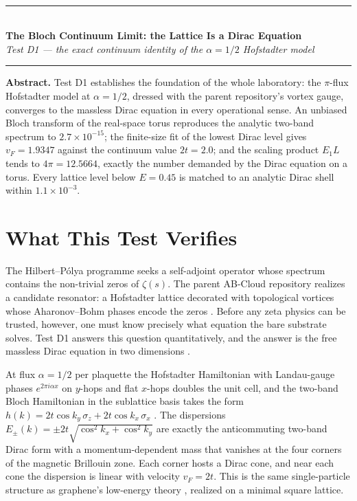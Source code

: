 \documentclass[11pt,a4paper]{article}
\begin{document}
\\[0.3em]
\rule{\textwidth}{0.8pt}\\[0.6em]
{\LARGE\bfseries\color{labblue} The Bloch Continuum Limit: the Lattice Is a Dirac Equation}\\[0.5em]
{\normalsize\itshape Test D1 — the exact continuum identity of the $\alpha=1/2$ Hofstadter model}\\[0.4em]
\rule{\textwidth}{0.4pt}

\begin{tcolorbox}[colback=labgreen!8, colframe=labgreen!70!black, title={Verdict: PASS — 5/5 checks}, fonttitle=\bfseries, boxrule=0.6pt]
\textbf{Abstract.} Test D1 establishes the foundation of the whole laboratory: the $\pi$-flux Hofstadter model at $\alpha = 1/2$, dressed with the parent repository's vortex gauge, converges to the massless Dirac equation in every operational sense. An unbiased Bloch transform of the real-space torus reproduces the analytic two-band spectrum to $2.7\times10^{-15}$; the finite-size fit of the lowest Dirac level gives $v_F = 1.9347$ against the continuum value $2t = 2.0$; and the scaling product $E_1 L$ tends to $4\pi = 12.5664$, exactly the number demanded by the Dirac equation on a torus. Every lattice level below $E = 0.45$ is matched to an analytic Dirac shell within $1.1\times10^{-3}$.
\end{tcolorbox}

\section{What This Test Verifies}
The Hilbert--P\'olya programme seeks a self-adjoint operator whose spectrum contains the non-trivial zeros of $\zeta(s)$. The parent AB-Cloud repository realizes a candidate resonator: a Hofstadter lattice decorated with topological vortices whose Aharonov--Bohm phases encode the zeros \cite{hofstadter,ab,parent}. Before any zeta physics can be trusted, however, one must know precisely what equation the bare substrate solves. Test D1 answers this question quantitatively, and the answer is the free massless Dirac equation in two dimensions \cite{dirac}.

At flux $\alpha = 1/2$ per plaquette the Hofstadter Hamiltonian with Landau-gauge phases $e^{2\pi i\alpha x}$ on $y$-hops and flat $x$-hops doubles the unit cell, and the two-band Bloch Hamiltonian in the sublattice basis takes the form $h(k) = 2t\cos k_y\,\sigma_z + 2t\cos k_x\,\sigma_x$ \cite{hofstadter}. The dispersions $E_{\pm}(k) = \pm 2t\sqrt{\cos^2 k_x + \cos^2 k_y}$ are exactly the anticommuting two-band Dirac form with a momentum-dependent mass that vanishes at the four corners of the magnetic Brillouin zone. Each corner hosts a Dirac cone, and near each cone the dispersion is linear with velocity $v_F = 2t$. This is the same single-particle structure as graphene's low-energy theory \cite{mecklenburgshen}, realized on a minimal square lattice.
\end{document}
